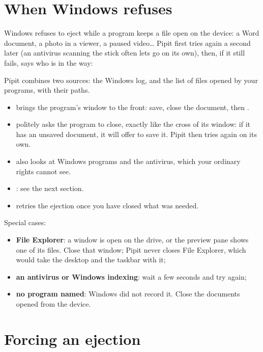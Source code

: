 \section{When Windows refuses}\label{sec:refus}

Windows refuses to eject while a program keeps a file open on the device: a Word
document, a photo in a viewer, a paused video… Pipit first tries again a second later
(an antivirus scanning the stick often lets go on its own), then, if it still fails,
says who is in the way:


Pipit combines two sources: the Windows log, and the list of files opened by your
programs, with their paths.

\begin{itemize}
\item {} brings the program's window to the front: save, close the document,
  then .
\item {} politely asks the program to close, exactly like the cross of its
  window: if it has an unsaved document, it will offer to save it. Pipit then tries
  again on its own.
\item {} also looks at Windows programs and the antivirus, which
  your ordinary rights cannot see.
\item {}: see the next section.
\item {} retries the ejection once you have closed what was needed.
\end{itemize}

Special cases:
\begin{itemize}
\item \textbf{File Explorer}: a window is open on the drive, or the preview pane shows one
  of its files. Close that window; Pipit never closes File Explorer, which would take the
  desktop and the taskbar with it;
\item \textbf{an antivirus or Windows indexing}: wait a few seconds and try again;
\item \textbf{no program named}: Windows did not record it. Close the documents opened
  from the device.
\end{itemize}

\section{Forcing an ejection}\label{sec:forcer}

